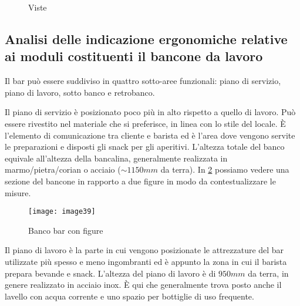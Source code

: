 \begin{figure}[H]
	\captionsetup[subfloat]{farskip=2pt,captionskip=8pt}
	\centering
	\hspace{1cm}
\end{figure}

\begin{figure}[H]
	\captionsetup[subfloat]{farskip=2pt,captionskip=8pt}
	\centering
	\hspace{1cm}
	
	\caption{Viste}
	\label{fig:pentagono}
\end{figure}




\subsection{Analisi delle indicazione ergonomiche relative ai moduli costituenti il bancone da lavoro }

Il bar può essere suddiviso in quattro sotto-aree funzionali: piano di servizio, piano di lavoro, sotto banco  e retrobanco.

Il piano di servizio è posizionato poco più in alto rispetto a quello di lavoro. Può essere rivestito nel materiale che si preferisce, in linea con lo stile del locale. 
È l’elemento di comunicazione tra cliente e barista ed è l’area dove vengono servite le preparazioni e disposti gli snack per gli aperitivi. L'altezza totale del banco equivale all'altezza della bancalina, generalmente realizzata in marmo/pietra/corian o acciaio  ($\sim  1150mm$ da terra). In \cref{fig:persone} possiamo vedere una sezione del bancone in rapporto a due figure in modo da contestualizzare le misure.

\begin{figure}[H]
	\centering
	\texttt{[image: image39]}
	\caption{Banco bar con figure}
	\label{fig:persone}
\end{figure}

\noindent
Il piano di lavoro è la parte in cui vengono posizionate le attrezzature del bar utilizzate più spesso e meno ingombranti ed è appunto la zona in cui il barista prepara bevande e snack. L’altezza del piano di lavoro è di  $950mm$ da terra, in genere realizzato in acciaio inox. È qui che generalmente trova posto anche il lavello con acqua corrente e uno spazio per bottiglie di uso frequente.


